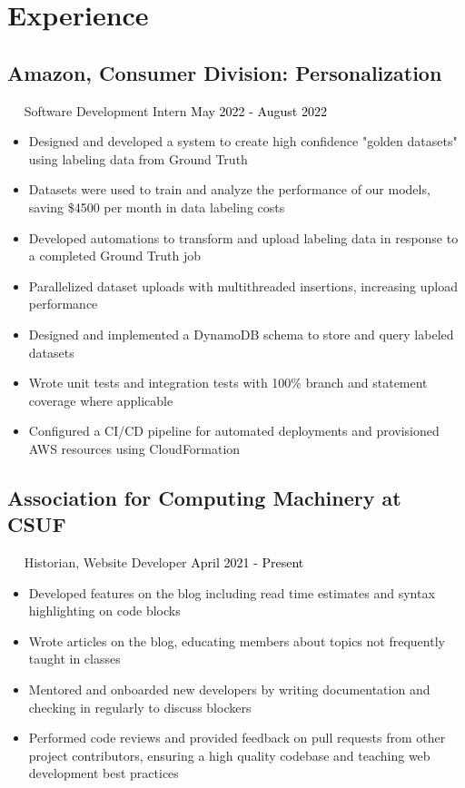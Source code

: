 \documentclass{article}
\newcommand{\resumesection}[3]{
    \subsection*{#1}
    \ 
    \ 
    \small
    \textcolor{csufgrey}{#2}
    \normalsize
    \hfill
    \textcolor{black}{#3}
    \normalsize
}
\begin{document}
\section*{Experience}
\resumesection{Amazon, Consumer Division: Personalization}{Software Development Intern}{May 2022 - August 2022}
\begin{itemize}
    \item Designed and developed a system to create high confidence "golden datasets" using labeling data from Ground Truth
    \item Datasets were used to train and analyze the performance of our models, saving \$4500 per month in data labeling costs
    \item Developed automations to transform and upload labeling data in response to a completed Ground Truth job
    \item Parallelized dataset uploads with multithreaded insertions, increasing upload performance
    \item Designed and implemented a DynamoDB schema to store and query labeled datasets
    \item Wrote unit tests and integration tests with 100\% branch and statement coverage where applicable
    \item Configured a CI/CD pipeline for automated deployments and provisioned AWS resources using CloudFormation
\end{itemize}
\resumesection{Association for Computing Machinery at CSUF}{Historian, Website Developer}{April 2021 - Present}
\begin{itemize}
    \item Developed features on the blog including read time estimates and syntax highlighting on code blocks
    \item Wrote articles on the blog, educating members about topics not frequently taught in classes
    \item Mentored and onboarded new developers by writing documentation and checking in regularly to discuss blockers
    \item Performed code reviews and provided feedback on pull requests from other project contributors, ensuring a high quality codebase and teaching web development best practices
\end{itemize}
\end{document}
